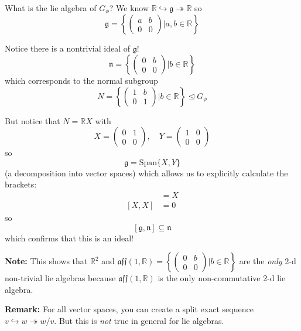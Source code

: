 \documentclass[12pt]{article}
\newcommand{\R}{\mathbb{R}}
\newcommand{\g}{\mathfrak{g}}
\begin{document}
    What is the lie algebra of $G_{\phi}$? We know $\R \hookrightarrow \g \twoheadrightarrow \R$ so 
    \[\g = \left\{\begin{pmatrix}
        a & b\\ 
        0 & 0
    \end{pmatrix} \bigg\vert a, b \in \R\right\}\]

    Notice there is a nontrivial ideal of $\g$!    
    \[\mathfrak{n} = \left\{\begin{pmatrix}
        0 & b\\ 
        0 & 0
    \end{pmatrix} \bigg\vert b \in \R \right\}\]
    which corresponds to the normal subgroup 
    \[N = \left\{\begin{pmatrix}
        1 & b\\ 
        0 & 1
    \end{pmatrix} \bigg\vert b \in \R\right\} \trianglelefteq G_{\phi}\]

    But notice that $N = \R X$ with 
    \[X = \begin{pmatrix}
        0 & 1\\ 
        0 & 0
    \end{pmatrix}, \quad Y = \begin{pmatrix}
        1 & 0\\ 
        0 & 0
    \end{pmatrix}\] 
    so 
    \[\g = \text{Span}\{X, Y\}\]
    (a decomposition into vector spaces) which allows us to explicitly calculate the brackets: 
    \begin{align*}
        [Y, X] &= X\\ 
        [X, X] &= 0
    \end{align*}
    so 
    \[[\g, \mathfrak{n}] \subseteq \mathfrak{n}\]
    which confirms that this is an ideal! 

    \textbf{Note:} This shows that $\R^2$ and $\mathfrak{aff}(1, \R) = \left\{\begin{pmatrix}
        0 & b\\ 
        0 & 0
    \end{pmatrix} \bigg\vert b \in \R \right\}$ are the \emph{only} 2-d non-trivial lie algebras because $\mathfrak{aff}(1, \R)$ is the only non-commutative 2-d lie algebra.

    \textbf{Remark:} For all vector spaces, you can create a split exact sequence $v \hookrightarrow w \twoheadrightarrow w/v$. But this is \emph{not} true in general for lie algebras. 
\end{document}
